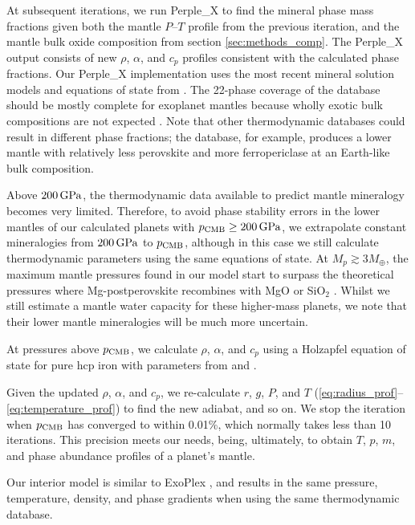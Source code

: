 At subsequent iterations, we run Perple\_X to find the mineral phase mass fractions given both the mantle $P$--$T$ profile from the previous iteration, and the mantle bulk oxide composition from section \ref{sec:methods_comp}. The Perple\_X output consists of new $\rho$, $\alpha$, and $c_p$ profiles consistent with the calculated phase fractions. Our Perple\_X implementation uses the most recent mineral solution models and equations of state from \citet{stixrude_thermal_2022}. The 22-phase coverage of the \citet{stixrude_thermal_2022} database should be mostly complete for exoplanet mantles because wholly exotic bulk compositions are not expected \citep{putirka_composition_2019}. Note that other thermodynamic databases could result in different phase fractions; the \citet{stixrude_thermodynamics_2011} database, for example, produces a lower mantle with relatively less perovskite and more ferropericlase at an Earth-like bulk composition.

Above $200\,{\rm GPa}$, the thermodynamic data available to predict mantle mineralogy becomes very limited. Therefore, to avoid phase stability errors in the lower mantles of our calculated planets with $p_{\rm CMB} \ge 200\,{\rm GPa}$, we extrapolate constant mineralogies from $200\,{\rm GPa}$ to $p_{\rm CMB}$, although in this case we still calculate thermodynamic parameters using the same equations of state. At $M_p \gtrsim 3 M_\oplus$, the maximum mantle pressures found in our model start to surpass the theoretical pressures where Mg-postperovskite recombines with MgO or SiO$_2$ \citep{umemoto_phase_2017}. Whilst we still estimate a mantle water capacity for these higher-mass planets, we note that their lower mantle mineralogies will be much more uncertain. 

At pressures above $p_{\rm CMB}$, we calculate $\rho$, $\alpha$, and $c_p$ using a Holzapfel equation of state for pure hcp iron with parameters from \citet{bouchet_initio_2013} and \citet{hakim_new_2018}. 

Given the updated $\rho$, $\alpha$, and $c_p$, we re-calculate $r$, $g$, $P$, and $T$ (\ref{eq:radius_prof}--\ref{eq:temperature_prof}) to find the new adiabat, and so on. We stop the iteration when $p_{\rm CMB}$ has converged to within 0.01\%, which normally takes less than 10 iterations. This precision meets our needs, being, ultimately, to obtain $T$, $p$, $m$, and phase abundance profiles of a planet's mantle.


Our interior model is similar to ExoPlex \citep{unterborn_inward_2018}, and results in the same pressure, temperature, density, and phase gradients when using the same thermodynamic database.

